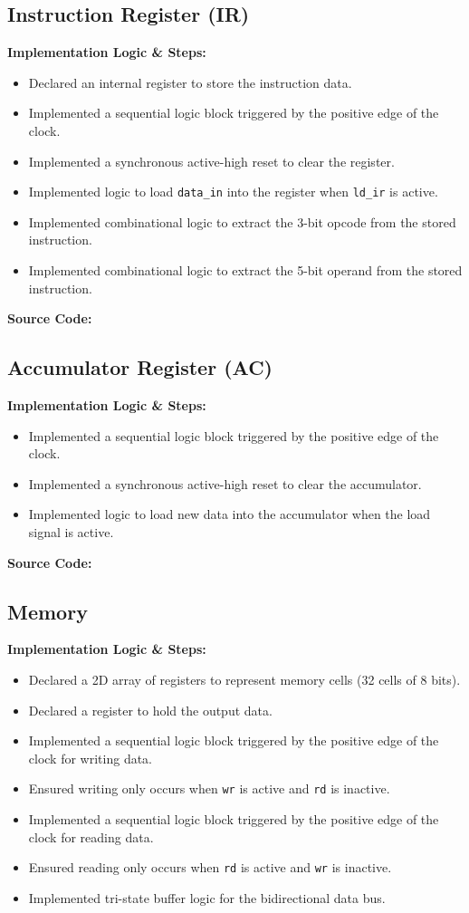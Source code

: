 \subsection{Instruction Register (IR)}
\textbf{Implementation Logic \& Steps:}
\begin{itemize}
	\item Declared an internal register to store the instruction data.
	\item Implemented a sequential logic block triggered by the positive edge of the clock.
	\item Implemented a synchronous active-high reset to clear the register.
	\item Implemented logic to load \texttt{data\_in} into the register when \texttt{ld\_ir} is active.
	\item Implemented combinational logic to extract the 3-bit opcode from the stored instruction.
	\item Implemented combinational logic to extract the 5-bit operand from the stored instruction.
\end{itemize}

\textbf{Source Code:}

\subsection{Accumulator Register (AC)}
\textbf{Implementation Logic \& Steps:}
\begin{itemize}
	\item Implemented a sequential logic block triggered by the positive edge of the clock.
	\item Implemented a synchronous active-high reset to clear the accumulator.
	\item Implemented logic to load new data into the accumulator when the load signal is active.
\end{itemize}

\textbf{Source Code:}

\subsection{Memory}
\textbf{Implementation Logic \& Steps:}
\begin{itemize}
	\item Declared a 2D array of registers to represent memory cells (32 cells of 8 bits).
	\item Declared a register to hold the output data.
	\item Implemented a sequential logic block triggered by the positive edge of the clock for writing data.
	\item Ensured writing only occurs when \texttt{wr} is active and \texttt{rd} is inactive.
	\item Implemented a sequential logic block triggered by the positive edge of the clock for reading data.
	\item Ensured reading only occurs when \texttt{rd} is active and \texttt{wr} is inactive.
	\item Implemented tri-state buffer logic for the bidirectional data bus.
\end{itemize}

